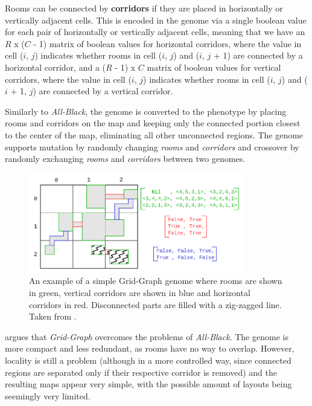 \documentclass{Configuration_Files/PoliMi3i_thesis}
\begin{document}
Rooms can be connected by \textbf{corridors} if they are placed in horizontally or vertically adjacent cells. This is encoded in the genome via a single boolean value for each pair of horizontally or vertically adjacent cells, meaning that we have an $R$ x ($C$ - 1) matrix of boolean values for horizontal corridors, where the value in cell ($i$, $j$) indicates whether rooms in cell ($i$, $j$) and ($i$, $j$ + 1) are connected by a horizontal corridor, and a ($R$ - 1) x $C$ matrix of boolean values for vertical corridors, where the value in cell ($i$, $j$) indicates whether rooms in cell ($i$, $j$) and ($i$ + 1, $j$) are connected by a vertical corridor.

Similarly to \textit{All-Black}, the genome is converted to the phenotype by placing rooms and corridors on the map and keeping only the connected portion closest to the center of the map, eliminating all other unconnected regions. The genome supports mutation by randomly changing \textit{rooms} and \textit{corridors} and crossover by randomly exchanging \textit{rooms} and \textit{corridors} between two genomes.

\begin{figure}[hbt!]
    \centering
    \includegraphics[width=0.85\textwidth]{images/GridGraph.png}
    \caption[Grid-Graph example]{An example of a simple Grid-Graph genome where rooms are shown in green, vertical corridors are shown in blue and horizontal corridors in red. Disconnected parts are filled with a zig-zagged line. Taken from \cite{bari_evolutionary-based_2023}.}
    \label{fig:grid_graph}
\end{figure}

\citeauthor{bari_evolutionary-based_2023} argues that \textit{Grid-Graph} overcomes the problems of \textit{All-Black}. The genome is more compact and less redundant, as rooms have no way to overlap. However, locality is still a problem (although in a more controlled way, since connected regions are separated only if their respective corridor is removed) and the resulting maps appear very simple, with the possible amount of layouts being seemingly very limited.
\end{document}
